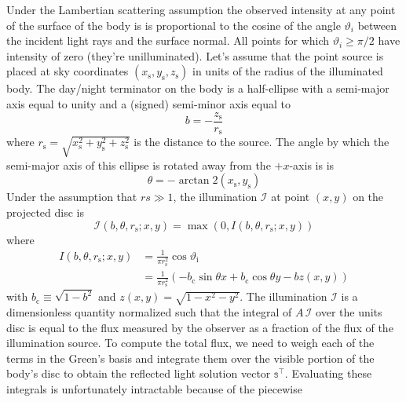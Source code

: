 \documentclass[12pt]{report}
\begin{document}
Under the Lambertian scattering assumption the observed intensity at any point
of the surface of the body is is proportional to the cosine of the angle
$\vartheta_i$ between the incident light rays and the surface normal. All
points for which $\vartheta_i\geq \pi/2$ have intensity of zero (they're
unilluminated). Let's assume that the point source is placed at sky coordinates
$\left(x_{\mathrm{s}}, y_{\mathrm{s}}, z_{\mathrm{s}}\right)$ in units of the
radius of the illuminated body. The day/night terminator on the body is a
half-ellipse with a semi-major axis equal to unity and a (signed) semi-minor
axis equal to
\begin{equation}
    b=-\frac{z_{\mathrm{s}}}{r_{\mathrm{s}}}
\end{equation}
where $r_{\mathrm{s}}=\sqrt{x_{\mathrm{s}}^{2}+y_{\mathrm{s}}^{2}+z_{\mathrm{s}}^{2}}$
is the distance to the source. The angle by which the semi-major axis of this ellipse is
rotated away from the $+x$-axis is  is
\begin{equation}
    \theta=-\arctan 2\left(x_{\mathrm{s}}, y_{\mathrm{s}}\right)
\end{equation}
Under the assumption that $rs \gg 1$, the illumination $\mathcal{I}$ at point
$(x,y)$ on the projected disc is \citep{2021arXiv210306275L}
\begin{equation}
    \mathcal{I}\left(b, \theta, r_{\mathrm{s}} ; x, y\right)=\max \left(0, I\left(b, \theta, r_{\mathrm{s}} ; x, y\right)\right)
    \label{eq:illumination}
\end{equation}
where
\begin{align}
    I\left(b, \theta, r_{\mathrm{s}} ; x, y\right) & =\frac{1}{\pi r_{\mathrm{s}}^{2}} \cos \vartheta_{\mathrm{i}}                                                      \\
                                                   & =\frac{1}{\pi r_{\mathrm{s}}^{2}}\left(-b_{\mathrm{c}} \sin \theta x+b_{\mathrm{c}} \cos \theta y-b z(x, y)\right)
\end{align}
with  $b_{\mathrm{c}} \equiv \sqrt{1-b^{2}}$  and $z(x, y)=\sqrt{1-x^{2}-y^{2}}$.
The illumination $\mathcal{I}$ is a dimensionless quantity normalized such that the
integral of $A\,\mathcal{I}$ over the units disc is equal to the flux measured by the
observer as a fraction of the flux of the illumination source.
To compute the total flux, we need to weigh each of the terms in the Green's basis
and integrate them over the visible portion of the body's disc to obtain
the reflected light solution vector $\mathbb{s}^\top$.
Evaluating these integrals is unfortunately intractable because of the piecewise
\end{document}

